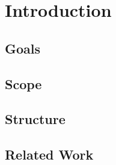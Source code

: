 
\chapter{Introduction}


\section{Goals}

\section{Scope}

\section{Structure}

\section{Related Work}